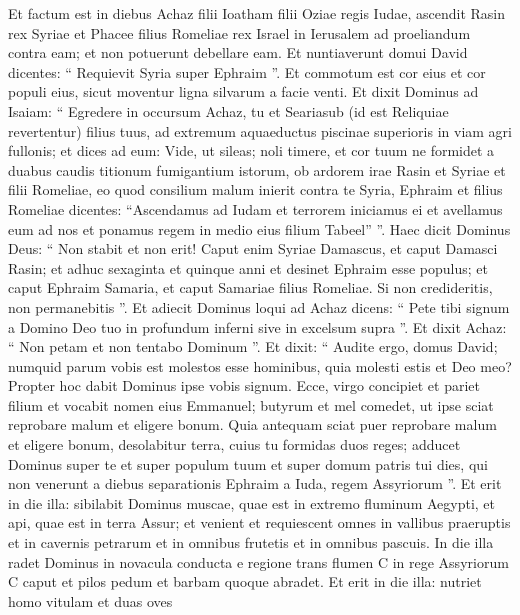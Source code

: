 \begin{biblechapter}
\begin{biblechapter}
\begin{biblechapter}
\begin{biblechapter}
\begin{biblechapter}
\begin{biblechapter}
\begin{biblechapter}
\verse Et factum est in diebus Achaz filii Ioatham filii Oziae regis Iudae, ascendit Rasin rex Syriae et Phacee filius Romeliae rex Israel in Ierusalem ad proeliandum contra eam; et non potuerunt debellare eam. 
\verse Et nuntiaverunt domui David dicentes: “ Requievit Syria super Ephraim ”. Et commotum est cor eius et cor populi eius, sicut moventur ligna silvarum a facie venti. 
\verse Et dixit Dominus ad Isaiam: “ Egredere in occursum Achaz, tu et Seariasub (id est Reliquiae revertentur) filius tuus, ad extremum aquaeductus piscinae superioris in viam agri fullonis; 
\verse et dices ad eum: Vide, ut sileas; noli timere, et cor tuum ne formidet a duabus caudis titionum fumigantium istorum, ob ardorem irae Rasin et Syriae et filii Romeliae, 
\verse eo quod consilium malum inierit contra te Syria, Ephraim et filius Romeliae dicentes: 
\verse “Ascendamus ad Iudam et terrorem iniciamus ei et avellamus eum ad nos et ponamus regem in medio eius filium Tabeel” ”.
 \verse Haec dicit Dominus Deus:
 “ Non stabit et non erit!
 \verse Caput enim Syriae Damascus,
 et caput Damasci Rasin;
 et adhuc sexaginta et quinque anni
 et desinet Ephraim esse populus;
 \verse et caput Ephraim Samaria,
 et caput Samariae filius Romeliae.
 Si non credideritis, non permanebitis ”.
 \verse Et adiecit Dominus loqui ad Achaz dicens: 
\verse “ Pete tibi signum a Domino Deo tuo in profundum inferni sive in excelsum supra ”. 
\verse Et dixit Achaz: “ Non petam et non tentabo Dominum ”. 
\verse Et dixit: “ Audite ergo, domus David; numquid parum vobis est molestos esse hominibus, quia molesti estis et Deo meo? 
\verse Propter hoc dabit Dominus ipse vobis signum. Ecce, virgo concipiet et pariet filium et vocabit nomen eius Emmanuel; 
\verse butyrum et mel comedet, ut ipse sciat reprobare malum et eligere bonum. 
\verse Quia antequam sciat puer reprobare malum et eligere bonum, desolabitur terra, cuius tu formidas duos reges; 
\verse adducet Dominus super te et super populum tuum et super domum patris tui dies, qui non venerunt a diebus separationis Ephraim a Iuda, regem Assyriorum ”.
 \verse Et erit in die illa:
 sibilabit Dominus muscae,
 quae est in extremo fluminum Aegypti,
 et api, quae est in terra Assur;
 \verse et venient et requiescent omnes
 in vallibus praeruptis
 et in cavernis petrarum
 et in omnibus frutetis
 et in omnibus pascuis.
 \verse In die illa radet Dominus
 in novacula conducta e regione trans flumen
 C in rege Assyriorum C
 caput et pilos pedum
 et barbam quoque abradet.
 \verse Et erit in die illa:
 nutriet homo vitulam et duas oves

\end{biblechapter}
\end{biblechapter}
\end{biblechapter}
\end{biblechapter}
\end{biblechapter}
\end{biblechapter}
\end{biblechapter}
